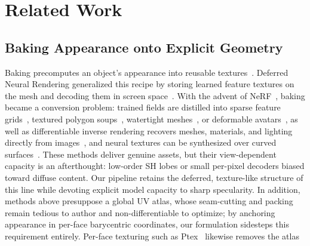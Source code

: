 \section{Related Work}

\subsection{Baking Appearance onto Explicit Geometry}
Baking precomputes an object's appearance into reusable textures~\citep{RealTimeRendering}.
Deferred Neural Rendering generalized this recipe by storing learned feature textures on the mesh and decoding them in screen space~\citep{DNR}.
With the advent of NeRF~\citep{NeRFVanilla}, baking became a conversion problem:
trained fields are distilled into sparse feature grids~\citep{bakingNeRF}, textured polygon soups~\citep{MobileNeRF}, watertight meshes~\citep{bakedSDF}, or deformable avatars~\citep{bakedAvatar},
as well as differentiable inverse rendering recovers meshes, materials, and lighting directly from images~\citep{nvdiffrec},
and neural textures can be synthesized over curved surfaces~\citep{nerfTexture}.
These methods deliver genuine assets, but their view-dependent capacity is an afterthought:
low-order SH lobes or small per-pixel decoders biased toward diffuse content.
Our pipeline retains the deferred, texture-like structure of this line
while devoting explicit model capacity to sharp specularity.
In addition, methods above presuppose a global UV atlas,
whose seam-cutting and packing remain tedious to author and non-differentiable to optimize;
by anchoring appearance in per-face barycentric coordinates, our formulation sidesteps this requirement entirely. Per-face texturing such as Ptex~\citep{ptex} likewise removes the atlas 

